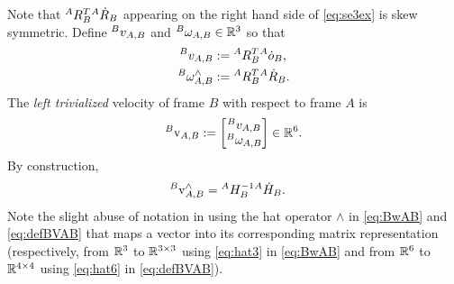 Note that $\hspace{0em}^A {R}_B^T \hspace{0em}^A \dot{R}_B$ appearing on the right hand side of \eqref{eq:se3ex} is skew symmetric. 
Define $\hspace{0em}^B v_{A,B}$ and $\hspace{0em}^B \omega_{A,B} \in \mathbb{R}^3$ so that
\begin{align}
\label{eq:BvAB}
  \hspace{0em}^B v_{A,B} 
& := 
  \hspace{0em}^A R_B^T \hspace{0em}^A {\dot o}_B ,
\\ 
\label{eq:BwAB}
  \hspace{0em}^B \omega^{\wedge}_{A,B} 
& := 
  \hspace{0em}^A R_B^T \hspace{0em}^A {\dot R}_B .
\end{align}
The \emph{left trivialized} velocity of frame $B$ 
with respect to frame $A$ is
\begin{equation}
\hspace{0em}^B {\rm v}_{A,B} := 
\begin{bmatrix}
\hspace{0em}^{B} v_{A,B} \\
\hspace{0em}^{B} \omega_{A,B}
\end{bmatrix} 
\in \mathbb{R}^6 .
\end{equation}
By construction, 
\begin{align}\label{eq:defBVAB}
  \hspace{0em}^B {\rm v}^{\wedge}_{A,B} 
& = 
  \hspace{0em}^{A} H_{B}^{-1}  \hspace{0em}^{A} \dot{H}_{B} .
\end{align}
Note the slight abuse of notation in using the
hat operator $\wedge$ in \eqref{eq:BwAB}
and \eqref{eq:defBVAB} that maps a vector
into its corresponding matrix representation 
(respectively, from $\mathbb{R}^3$ to $\mathbb{R}^{3\times 3}$
using \eqref{eq:hat3} in \eqref{eq:BwAB} and from $\mathbb{R}^6$ to $\mathbb{R}^{4\times4}$ using \eqref{eq:hat6} in \eqref{eq:defBVAB}).


